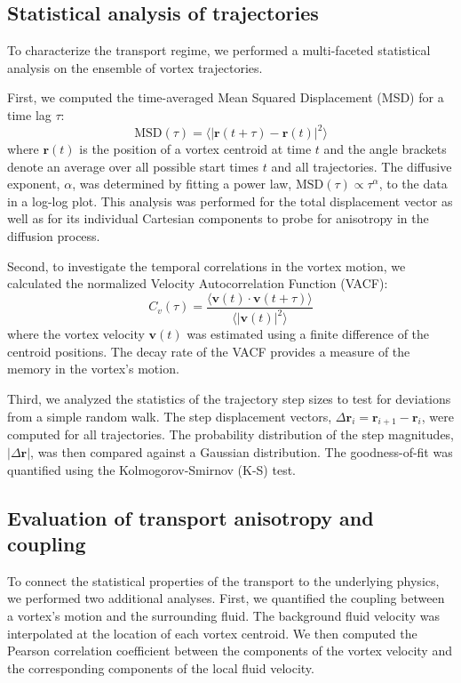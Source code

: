 \documentclass[]{article}
\begin{document}
\subsection{Statistical analysis of trajectories}
To characterize the transport regime, we performed a multi-faceted statistical analysis on the ensemble of vortex trajectories.

First, we computed the time-averaged Mean Squared Displacement (MSD) for a time lag $\tau$:
\begin{equation}
    \text{MSD}(\tau) = \langle |\mathbf{r}(t+\tau) - \mathbf{r}(t)|^2 \rangle
\end{equation}
where $\mathbf{r}(t)$ is the position of a vortex centroid at time $t$ and the angle brackets denote an average over all possible start times $t$ and all trajectories. The diffusive exponent, $\alpha$, was determined by fitting a power law, $\text{MSD}(\tau) \propto \tau^\alpha$, to the data in a log-log plot. This analysis was performed for the total displacement vector as well as for its individual Cartesian components to probe for anisotropy in the diffusion process.

Second, to investigate the temporal correlations in the vortex motion, we calculated the normalized Velocity Autocorrelation Function (VACF):
\begin{equation}
    C_v(\tau) = \frac{\langle \mathbf{v}(t) \cdot \mathbf{v}(t+\tau) \rangle}{\langle |\mathbf{v}(t)|^2 \rangle}
\end{equation}
where the vortex velocity $\mathbf{v}(t)$ was estimated using a finite difference of the centroid positions. The decay rate of the VACF provides a measure of the memory in the vortex's motion.

Third, we analyzed the statistics of the trajectory step sizes to test for deviations from a simple random walk. The step displacement vectors, $\Delta \mathbf{r}_i = \mathbf{r}_{i+1} - \mathbf{r}_i$, were computed for all trajectories. The probability distribution of the step magnitudes, $|\Delta \mathbf{r}|$, was then compared against a Gaussian distribution. The goodness-of-fit was quantified using the Kolmogorov-Smirnov (K-S) test.

\subsection{Evaluation of transport anisotropy and coupling}
To connect the statistical properties of the transport to the underlying physics, we performed two additional analyses. First, we quantified the coupling between a vortex's motion and the surrounding fluid. The background fluid velocity was interpolated at the location of each vortex centroid. We then computed the Pearson correlation coefficient between the components of the vortex velocity and the corresponding components of the local fluid velocity.
\end{document}
